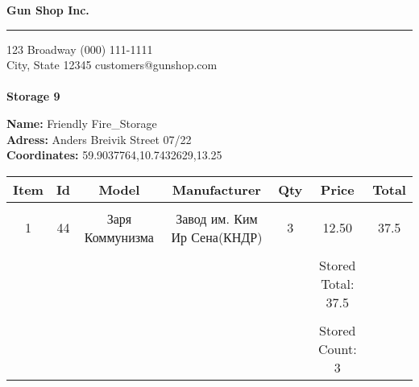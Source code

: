 \documentclass{article}
\begin{document}
\hfil{\Huge\bf Gun Shop Inc.}\hfil
\bigskip
\hrule
\bigskip

123 Broadway \hfill (000) 111-1111 \\
City, State 12345 \hfill customers@gunshop.com\\ \\

\hfill{\bf Storage 9}\hfill
\bigskip

{\bf Name:}   Friendly Fire\_Storage\\
{\bf Adress:}  Anders Breivik Street 07/22 \\
{\bf Coordinates:}  59.9037764,10.7432629,13.25 \\ 
\begin{center}
\begin{tabular}{ c c c c c c c }
  Item & Id & Model & Manufacturer & Qty & Price & Total  \\[2ex]
\hline\\
 1 & 44 & Заря Коммунизма& Завод им. Ким Ир Сена(КНДР)& 3 & 12.50 & 37.5 \\ [2ex]\hline\\&&&&&Stored Total: 37.5&\\[2ex]\hline\\&&&&&Stored Count: 3&\\[2ex]\end{tabular}\end{center}
\end{document}
